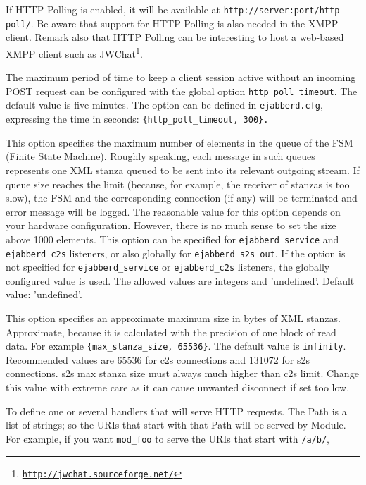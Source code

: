 \documentclass[a4paper,10pt]{book}
\newcommand{\ind}[1]{\begin{latexonly}\index{#1}\end{latexonly}}
\newcommand{\bracehack}{\def\{{\char"7B}\def\}{\char"7D}}
\newcommand{\titem}[1]{\item[\bracehack\texttt{#1}]}
\newcommand{\term}[1]{\texttt{#1}}
\newcommand{\XMPP}{XMPP}
\gdef\footahref#1#2{#2\footnote{\href{#1}{\texttt{#1}}}}
\begin{document}
\begin{description}
    If HTTP Polling is enabled, it will be available at
    \verb|http://server:port/http-poll/|. Be aware that support for HTTP Polling
    is also needed in the \XMPP{} client. Remark also that HTTP Polling can be
    interesting to host a web-based \XMPP{} client such as
    \footahref{http://jwchat.sourceforge.net/}{JWChat}.

    The maximum period of time to keep a client session active without
    an incoming POST request can be configured with the global option
    \term{http\_poll\_timeout}. The default value is five minutes.
    The option can be defined in \term{ejabberd.cfg}, expressing the time
    in seconds: \verb|{http_poll_timeout, 300}.|
  \titem{\{max\_fsm\_queue, Size\}}
    This option specifies the maximum number of elements in the queue of the FSM
    (Finite State Machine).
    Roughly speaking, each message in such queues represents one XML
    stanza queued to be sent into its relevant outgoing stream. If queue size
    reaches the limit (because, for example, the receiver of stanzas is too slow),
    the FSM and the corresponding connection (if any) will be terminated
    and error message will be logged.
    The reasonable value for this option depends on your hardware configuration.
    However, there is no much sense to set the size above 1000 elements.
    This option can be specified for \term{ejabberd\_service} and
    \term{ejabberd\_c2s} listeners,
    or also globally for \term{ejabberd\_s2s\_out}.
    If the option is not specified for \term{ejabberd\_service} or
    \term{ejabberd\_c2s} listeners,
    the globally configured value is used.
    The allowed values are integers and 'undefined'.
    Default value: 'undefined'.
  \titem{\{max\_stanza\_size, Size\}}
    \ind{options!max\_stanza\_size}This option specifies an
    approximate maximum size in bytes of XML stanzas.  Approximate,
    because it is calculated with the precision of one block of read
    data. For example \verb|{max_stanza_size, 65536}|.  The default
    value is \term{infinity}. Recommended values are 65536 for c2s
    connections and 131072 for s2s connections. s2s max stanza size
    must always much higher than c2s limit. Change this value with
    extreme care as it can cause unwanted disconnect if set too low.
  \titem{\{request\_handlers, [ \{Path, Module\}, ...]\}} To define one or several handlers that will serve HTTP requests.
    The Path is a list of strings; so the URIs that start with that Path will be served by Module.
    For example, if you want \term{mod\_foo} to serve the URIs that start with \term{/a/b/},

\end{description}
\end{document}
